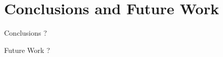 \section{Conclusions and Future Work}

\begin{frame}{Conclusions}
?
\end{frame}

\begin{frame}{Future Work}
?
\end{frame}

